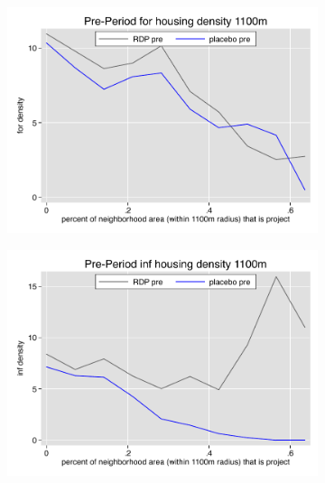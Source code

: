 \documentclass[12pt]{article}
\begin{document}
\begin{figure}
        \begin{subfigure}[b]{0.495\textwidth}
            \centering
            \includegraphics[width=\textwidth,trim={0.3cm .3cm 0.1cm 0cm}, clip=true]{figures/overlap_for_1100_local_pre.pdf}
        \end{subfigure}
        \hfill
        \begin{subfigure}[b]{0.495\textwidth}  
            \centering 
            \includegraphics[width=\textwidth,trim={0.3cm .3cm 0.1cm 0cm}, clip=true]{figures/overlap_inf_1100_local_pre.pdf}
        \end{subfigure}
        \vspace{-6mm}

\end{figure}
\end{document}

